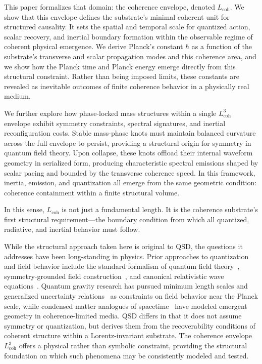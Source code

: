 \documentclass[entropy,article,submit,pdftex,oneauthor]{Definitions/mdpi}
\begin{document}
This paper formalizes that domain: the coherence envelope, denoted \texorpdfstring{\( L_{\text{coh}} \)}{Lcoh}. We show that this envelope defines the substrate’s minimal coherent unit for structured causality. It sets the spatial and temporal scale for quantized action, scalar recovery, and inertial boundary formation within the observable regime of coherent physical emergence. We derive Planck’s constant \texorpdfstring{\( \hbar \)}{hbar} as a function of the substrate’s transverse and scalar propagation modes and this coherence area, and we show how the Planck time and Planck energy emerge directly from this structural constraint. Rather than being imposed limits, these constants are revealed as inevitable outcomes of finite coherence behavior in a physically real medium.

We further explore how phase-locked mass structures within a single \texorpdfstring{\( L_{\text{coh}}^3 \)}{Lcoh\^{}3} envelope exhibit symmetry constraints, spectral signatures, and inertial reconfiguration costs. Stable mass-phase knots must maintain balanced curvature across the full envelope to persist, providing a structural origin for symmetry in quantum field theory. Upon collapse, these knots offload their internal waveform geometry in serialized form, producing characteristic spectral emissions shaped by scalar pacing and bounded by the transverse coherence speed. In this framework, inertia, emission, and quantization all emerge from the same geometric condition: coherence containment within a finite structural volume.

In this sense, \texorpdfstring{\( L_{\text{coh}} \)}{Lcoh} is not just a fundamental length. It is the coherence substrate’s first structural requirement---the boundary condition from which all quantized, radiative, and inertial behavior must follow.

While the structural approach taken here is original to QSD, the questions it addresses have been long-standing in physics. Prior approaches to quantization and field behavior include the standard formalism of quantum field theory~\cite{peskin1995}, symmetry-grounded field construction~\cite{weinberg1995}, and canonical relativistic wave equations~\cite{ryder1996}. Quantum gravity research has pursued minimum length scales and generalized uncertainty relations~\cite{amelino1994, garay1995} as constraints on field behavior near the Planck scale, while condensed matter analogues of spacetime~\cite{volovik2003, barcelo2005} have modeled emergent geometry in coherence-limited media. QSD differs in that it does not assume symmetry or quantization, but derives them from the recoverability conditions of coherent structure within a Lorentz-invariant substrate. The coherence envelope \( L_{\text{coh}}^3 \) offers a physical rather than symbolic constraint, providing the structural foundation on which such phenomena may be consistently modeled and tested.
\end{document}
